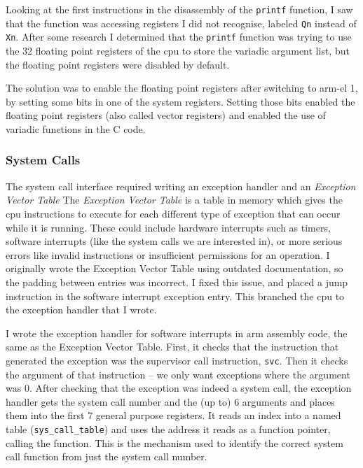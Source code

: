 \documentclass{article}
\begin{document}
Looking at the first instructions in the disassembly of the \verb!printf!
function, I saw that the function was accessing registers I did not recognise,
labeled \texttt{Qn} instead of \texttt{Xn}. After some research I determined
that the \verb!printf! function was trying to use the 32 floating point
registers of the \gls{cpu} to store the variadic argument list, but the
floating point registers were disabled by default.

The solution was to enable the floating point registers after switching to
\gls{arm-el} 1, by setting some bits in one of the system registers. Setting
those bits enabled the floating point registers (also called vector registers)
and enabled the use of variadic functions in the C code.

\subsubsection{System Calls}
\label{sec:impl_syscalls}
The system call interface required writing an exception handler and an
\emph{Exception Vector Table} The \emph{Exception Vector Table} is a
table in memory which gives the \gls{cpu} instructions to execute for each
different type of exception that can occur while it is running. These could
include hardware interrupts such as timers, software interrupts (like the
system calls we are interested in), or more serious errors like invalid
instructions or insufficient permissions for an operation. I originally wrote
the Exception Vector Table using outdated documentation, so the padding between
entries was incorrect. I fixed this issue, and placed a jump instruction in the
software interrupt exception entry. This branched the \gls{cpu} to the
exception handler that I wrote.

I wrote the exception handler for software interrupts in \gls{arm} assembly
code, the same as the Exception Vector Table. First, it checks that the
instruction that generated the exception was the supervisor call instruction,
\verb!svc!. Then it checks the argument of that instruction -- we only want
exceptions where the argument was 0. After checking that the exception was
indeed a system call, the exception handler gets the system call number and the
(up to) 6 arguments and places them into the first 7 general purpose registers.
It reads an index into a named table (\verb!sys_call_table!) and uses the
address it reads as a function pointer, calling the function. This is the
mechanism used to identify the correct system call function from just the
system call number.
\end{document}
